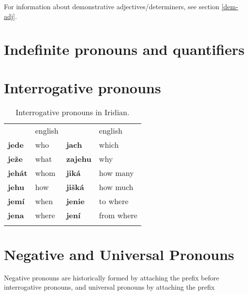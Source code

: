 For information about demonstrative adjectives/determiners, see section \ref{dem-adj}.

\section{Indefinite pronouns and quantifiers}


\section{Interrogative pronouns}

\begin{table}[h!]
	\small\centering
	\caption{Interrogative pronouns in Iridian.}
	\begin{tabu} to 0.8
		\toprule\addlinespace
		&{\sc english}&&{\sc english}\\ \addlinespace
		\midrule\addlinespace
		jede 		& who &jach &which\\ \addlinespace
		ježe 	& what 		& zajehu 	&why\\ \addlinespace
		jehát 	& whom		& jiká 	&how many\\ \addlinespace
		jehu 		& how		&jišká&how much\\ \addlinespace
		jemí 		& when 		& jenie 	&to where\\ \addlinespace
		jena 		& where 	& jení 	&from where\\ \addlinespace
		\bottomrule
	\end{tabu}
\end{table}

\section{Negative and Universal Pronouns}

Negative pronouns are historically formed by attaching the prefix  before interrogative pronouns, and universal pronouns by attaching the prefix 

